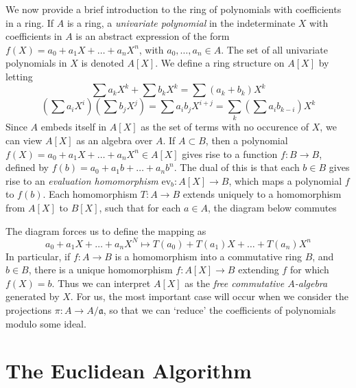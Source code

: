 We now provide a brief introduction to the ring of polynomials with coefficients in a ring. If $A$ is a ring, a {\it univariate polynomial} in the indeterminate $X$ with coefficients in $A$ is an abstract expression of the form $f(X) = a_0 + a_1 X + \dots + a_n X^n$, with $a_0,\dots,a_n \in A$. The set of all univariate polynomials in $X$ is denoted $A[X]$. We define a ring structure on $A[X]$ by letting
%
\[ \sum a_k X^k + \sum b_k X^k = \sum (a_k + b_k) X^k \]
%
\[ \left( \sum a_i X^i \right) \left( \sum b_j X^j \right) = \sum a_i b_j X^{i + j} = \sum_k \left( \sum a_i b_{k - i} \right) X^k \]
%
Since $A$ embeds itself in $A[X]$ as the set of terms with no occurence of $X$, we can view $A[X]$ as an algebra over $A$. If $A \subset B$, then a polynomial $f(X) = a_0 + a_1 X + \dots + a_n X^n \in A[X]$ gives rise to a function $f: B \to B$, defined by $f(b) = a_0 + a_1 b + \dots + a_n b^n$. The dual of this is that each $b \in B$ gives rise to an {\it evaluation homomorphism} $\text{ev}_b: A[X] \to B$, which maps a polynomial $f$ to $f(b)$. Each homomorphism $T: A \to B$ extends uniquely to a homomorphism from $A[X]$ to $B[X]$, such that for each $a \in A$, the diagram below commutes
%
\begin{center}
\end{center}
%
The diagram forces us to define the mapping as
%
\[ a_0 + a_1 X + \dots + a_n X^N \mapsto T(a_0) + T(a_1) X + \dots + T(a_n) X^n \]
%
In particular, if $f: A \to B$ is a homomorphism into a commutative ring $B$, and $b \in B$, there is a unique homomorphism $f: A[X] \to B$ extending $f$ for which $f(X) = b$. Thus we can interpret $A[X]$ as the {\it free commutative $A$-algebra} generated by $X$. For us, the most important case will occur when we consider the projections $\pi: A \to A/\mathfrak{a}$, so that we can `reduce' the coefficients of polynomials modulo some ideal.

\section{The Euclidean Algorithm}

